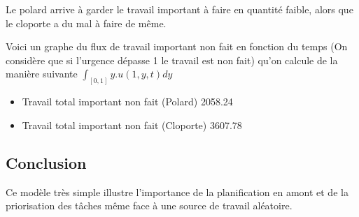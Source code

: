 \documentclass[french]{article}
\begin{document}
    Le polard arrive à garder le travail important à faire en quantité faible, alors que le cloporte a du mal à faire de même.
    
    Voici un graphe du flux de travail important non fait en fonction du temps (On considère que si l'urgence dépasse 1 le travail est non fait)
    qu'on calcule de la manière suivante $\int_{[0,1]}y.u(1,y,t)dy$
    \begin{itemize}
        \item{Travail total important non fait (Polard) 2058.24}
        \item{Travail total important non fait (Cloporte) 3607.78}
    \end{itemize}
    \subsection{Conclusion}
        Ce modèle très simple illustre l'importance de la planification en amont et de la priorisation des tâches 
        même face à une source de travail aléatoire. 
    
\end{document}
